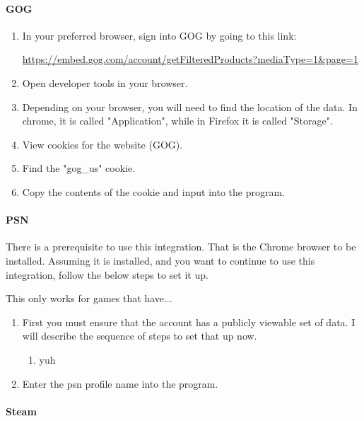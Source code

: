 \paragraph{GOG}

\begin{enumerate}
	\item In your preferred browser, sign into GOG by going to
		this link:

		\href{https://embed.gog.com/account/getFilteredProducts?mediaType=1&page=1}{https://embed.gog.com/account/getFilteredProducts?mediaType=1\&page=1}
	\item Open developer tools in your browser.
	\item Depending on your browser, you will need to find the location
		of the data. In chrome, it is called "Application", while in
		Firefox it is called "Storage".
	\item View cookies for the website (GOG).
	\item Find the "gog\_us" cookie.
	\item Copy the contents of the cookie and input into the program.
\end{enumerate}

\paragraph{PSN}

There is a prerequisite to use this integration. That is the Chrome
browser to be installed. Assuming it is installed, and you want to
continue to use this integration, follow the below steps to set it up.

This only works for games that have...

\begin{enumerate}
	\item First you must ensure that the account has a publicly viewable
		set of data. I will describe the sequence of steps to set that up now.
		\begin{enumerate}
			\item yuh
		\end{enumerate}
	\item Enter the psn profile name into the program.
\end{enumerate}

\paragraph{Steam}


